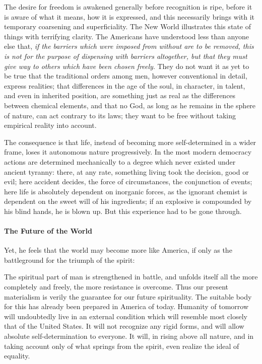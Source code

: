 \begin{quotationx}
The desire for freedom is awakened generally before recognition is ripe, before it is aware of what it means, how it is expressed, and this necessarily brings with it temporary coarsening and superficiality. The New World illustrates this state of things with terrifying clarity. The Americans have understood less than anyone else that, \emph{if the barriers which were imposed from without are to be removed, this is not for the purpose of dispensing with barriers altogether, but that they must give way to others which have been chosen freely}. They do not want it as yet to be true that the traditional orders among men, however conventional in detail, express realities; that differences in the age of the soul, in character, in talent, and even in inherited position, are something just as real as the differences between chemical elements, and that no God, as long as he remains in the sphere of nature, can act contrary to its laws; they want to be free without taking empirical reality into account.

The consequence is that life, instead of becoming more self-determined in a wider frame, loses it autonomous nature progressively. In the most modern democracy actions are determined mechanically to a degree which never existed under ancient tyranny: there, at any rate, something living took the decision, good or evil; here accident decides, the force of circumstances, the conjunction of events; here life is absolutely dependent on inorganic forces, as the ignorant chemist is dependent on the sweet will of his ingredients; if an explosive is compounded by his blind hands, he is blown up. But this experience had to be gone through.
\end{quotationx}


\paragraph{The Future of the World}


Yet, he feels that the world may become more like America, if only as the battleground for the triumph of the spirit:

\begin{quotex}
The spiritual part of man is strengthened in battle, and unfolds itself all the more completely and freely, the more resistance is overcome. Thus our present materialism is verily the guarantee for our future spirituality. The suitable body for this has already been prepared in America of today. Humanity of tomorrow will undoubtedly live in an external condition which will resemble most closely that of the United States. It will not recognize any rigid forms, and will allow absolute self-determination to everyone. It will, in rising above all nature, and in taking account only of what springs from the spirit, even realize the ideal of equality.
\end{quotex}



